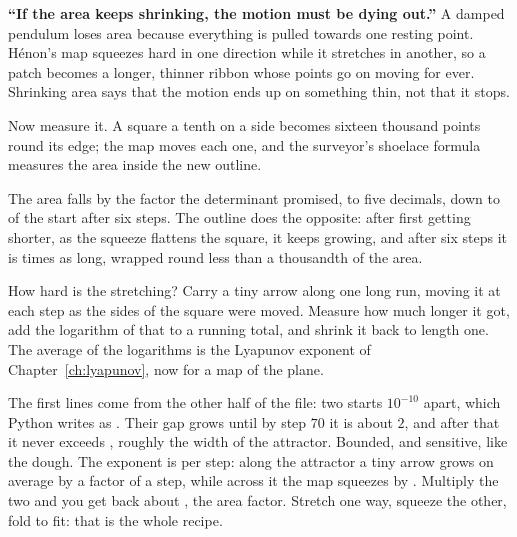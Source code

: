 \begin{trapbox}
\textbf{\enquote{If the area keeps shrinking, the motion must be dying out.}}
A damped pendulum loses area because everything is pulled towards one resting
point. Hénon's map squeezes hard in one direction while it stretches in
another, so a patch becomes a longer, thinner ribbon whose points go on moving
for ever. Shrinking area says that the motion ends up on something thin, not
that it stops.
\end{trapbox}

\noindent
Now measure it. A square a tenth on a side becomes sixteen thousand points
round its edge; the map moves each one, and the surveyor's shoelace formula
measures the area inside the new outline.



\noindent
The area falls by the factor the determinant promised, to five decimals,
down to  of the start after six steps. The outline does
the opposite: after first getting shorter, as the squeeze flattens the square,
it keeps growing, and after six steps it is  times as
long, wrapped round less than a thousandth of the area.


\noindent
How hard is the stretching? Carry a tiny arrow along one long run, moving it
at each step as the sides of the square were moved. Measure how much longer
it got, add the logarithm of that to a running total, and shrink it back to
length one. The average of the logarithms is the Lyapunov exponent of
Chapter~\ref{ch:lyapunov}, now for a map of the plane.



\noindent
The first lines come from the other half of the file: two starts $10^{-10}$
apart, which Python writes as . Their gap grows until by step
$70$ it is about $2$, and after that it never exceeds ,
roughly the width of the attractor. Bounded, and sensitive, like the dough.
The exponent is  per step: along the attractor a tiny arrow
grows on average by a factor of  a step, while across it the
map squeezes by . Multiply the two and you get back about
, the area factor. Stretch one way, squeeze the other, fold to
fit: that is the whole recipe.

